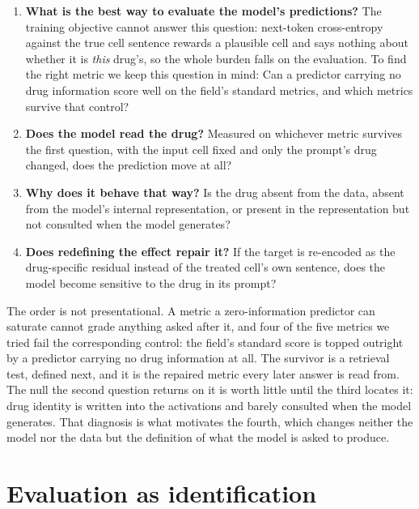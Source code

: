 \begin{enumerate}
  \item \textbf{What is the best way to evaluate the model's predictions?} The training objective cannot answer
  this question: next-token cross-entropy against the true cell sentence rewards a
  plausible cell and says nothing about whether it is \emph{this} drug's,
  so the whole burden falls on the evaluation. To find the right metric we keep this question in mind: Can a predictor carrying
  no drug information score well on the field's standard metrics, and
  which metrics survive that control?
  \item \textbf{Does the model read the drug?} Measured on whichever metric
        survives the first question, with the input cell fixed and only the
        prompt's drug changed, does the prediction move at all?
  \item \textbf{Why does it behave that way?} Is the drug absent from the data,
        absent from the model's internal representation, or present in the
        representation but not consulted when the model generates?
  \item \textbf{Does redefining the effect repair it?} If the target is
        re-encoded as the drug-specific residual instead of the treated cell's
        own sentence, does the model become sensitive to the drug in its prompt?
\end{enumerate}

\noindent
The order is not presentational. A metric a zero-information predictor can
saturate cannot grade anything asked after it, and four of the five metrics we
tried fail the corresponding control: the field's standard score is topped
outright by a predictor carrying no drug information at all. The survivor is a retrieval
test, defined next, and it is the repaired metric every later answer is read
from. The null the second question returns on it is worth little until the third
locates it: drug identity is written into the activations and barely consulted
when the model generates. That diagnosis is what motivates the fourth, which
changes neither the model nor the data but the definition of what the model is
asked to produce.

\section{Evaluation as identification}
\label{sec:intro-question}

